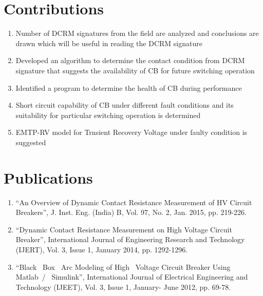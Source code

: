 
\section*{Contributions}
\begin{enumerate}
\item Number of DCRM signatures from the field are analyzed and conclusions are drawn which will be useful in reading the DCRM signature
\item Developed an algorithm to determine the contact condition from DCRM signature that suggests the availability of CB for future switching operation
\item Identified a program to determine the health of CB during performance
\item Short circuit capability of CB under different fault conditions and its suitability for particular switching operation is determined
\item EMTP-RV model for Trnsient Recovery Voltage under faulty condition is
suggested
\end{enumerate}
\clearpage



\clearpage

\section*{Publications}
\begin{enumerate}
\item \textquotedblleft An Overview of Dynamic Contact Resistance Measurement of HV Circuit Breakers\textquotedblright, J. Inst. Eng. (India) B, Vol. 97, No. 2, Jan. 2015, pp. 219-226.
\item \textquotedblleft Dynamic Contact Resistance Measurement on High Voltage Circuit Breaker\textquotedblright, International Journal of Engineering Research and Technology (IJERT), Vol. 3, Issue 1, January 2014, pp. 1292-1296.
\item \textquotedblleft Black ~Box ~Arc Modeling of High ~Voltage Circuit Breaker Using Matlab~/ ~Simulink\textquotedblright, International Journal of Electrical Engineering and Technology (IJEET), Vol. 3, Issue 1, January- June 2012, pp. 69-78. 
\end{enumerate}
\clearpage

